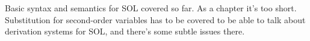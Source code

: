 \documentclass[../../../include/open-logic-chapter]{subfiles}
\begin{document}

\begin{editorial}
Basic syntax and semantics for SOL covered so far. As a chapter it's
too short. Substitution for second-order variables has to be covered
to be able to talk about derivation systems for SOL, and there's some
subtle issues there.
\end{editorial}







\OLEndChapterHook
\end{document}
